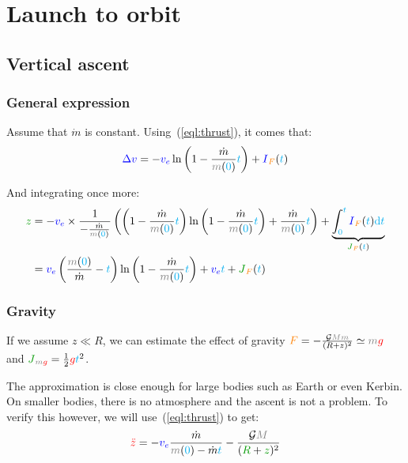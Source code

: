 \chapter{Launch to orbit}
\banner
{}

\section{Vertical ascent}

\subsection{General expression}

Assume that $\dot m$ is constant. Using~(\ref{eql:thrust}), it comes that:
\[
\speed{\Delta v}
= - \speed{v_e} \ln\left(1 - \frac {\dot m} {\mass{m}(\delay{0})} \delay{t}\right)
  + \speed{I}_{\force{F}}(\delay{t})
\]

And integrating once more:
\begin{align*}
\dist{z}
&= - \speed{v_e} \times \frac 1 {- \frac {\dot m} {\mass{m}(\delay{0})}}
\left(
	\left(1 - \frac {\dot m} {\mass{m}(\delay{0})} \delay{t}\right)
	\ln\left(1 - \frac {\dot m} {\mass{m}(\delay{0})} \delay{t}\right)
	+ \frac {\dot m} {\mass{m}(\delay{0})} \delay{t}
\right) + \underbrace{
	\int_{\delay{0}}^{\delay{t}} \speed{I}_{\force{F}}(\delay{t}) \delay{\dt}
}_{\dist{J}_{\force{F}}(\delay{t})} \\
& = \speed{v_e}
	\left(\frac {\mass{m}(\delay{0})} {\dot m} - \delay{t}\right)
	\ln\left(1 - \frac {\dot m} {\mass{m}(\delay{0})} \delay{t}\right)
	+ \speed{v_e} \delay{t}
+ \dist{J}_{\force{F}}(\delay{t})
\end{align*}

\subsection{Gravity}

If we assume $z \ll R$, we can estimate the effect of gravity $\force{F}
= - \frac {\mathcal G \mass{M} \mass{m}} {(R+z)^2} \simeq \mass{m}
\accel{g}$ and $\dist{J}_{\mass{m} \accel{g}} = \frac 1 2 \accel{g}
\delay{t}^2$.

The approximation is close enough for large bodies such as Earth or even
Kerbin. On smaller bodies, there is no atmosphere and the ascent is not
a problem. To verify this however, we will use~(\ref{eql:thrust}) to get:
\[
\accel{\ddot z}
= - \speed{v_e} \frac {\dot m} {\mass{m}(\delay{0}) - \dot m \delay{t}} - \frac {\mathcal G \mass{M}} {(\dist{R}+\dist{z})^2}
\]

